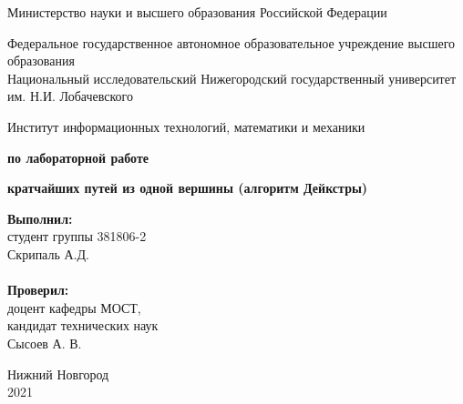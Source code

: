 \documentclass{report}
\begin{document}
\begin{titlepage}

\begin{center}
Министерство науки и высшего образования Российской Федерации
\end{center}

\begin{center}
Федеральное государственное автономное образовательное учреждение высшего образования \\
Национальный исследовательский Нижегородский государственный университет им. Н.И. Лобачевского
\end{center}

\begin{center}
Институт информационных технологий, математики и механики
\end{center}

\vspace{4em}

\begin{center}
\textbf{ по лабораторной работе} \\
\end{center}
\begin{center}
\textbf{ кратчайших путей из одной вершины (алгоритм Дейкстры)} \\
\end{center}

\vspace{4em}

\newbox{\lbox}
\newlength{\maxl}
\setlength{\maxl}{\wd\lbox}
\hfill\parbox{7cm}{
\hspace*{5cm}\hspace*{-5cm}\textbf{Выполнил:} \\ студент группы 381806-2 \\ Скрипаль А.Д.\\
\\
\hspace*{5cm}\hspace*{-5cm}\textbf{Проверил:}\\ доцент кафедры МОСТ, \\ кандидат технических наук \\ Сысоев А. В.
}

\vspace{\fill}

\begin{center} Нижний Новгород \\ 2021 \end{center}

\end{titlepage}
\end{document}
